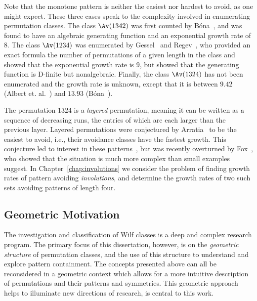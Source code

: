 \documentclass[12pt,twoside]{memoir}
\begin{document}
      Note that the monotone pattern is neither the easiest nor hardest to avoid,
      as one might expect.  These three cases speak to the complexity involved in
      enumerating permutation classes. The class $\Av(1342)$ was first counted by
      B\'ona~\cite{Bona1997}, and was found to have an algebraic generating
      function and an exponential growth rate  of $8$. The class $\Av(1234)$ was
      enumerated by Gessel~\cite{Gessel1990} and Regev~\cite{Regev}, who provided
      an exact formula the number of permutations of a given length in the class
      and showed that the exponential growth rate is $9$, but showed that the
      generating function is D-finite but nonalgebraic. Finally, the class
      $\Av(1324)$ has not been enumerated and the growth rate is unknown, except
      that it is between $9.42$ (Albert et.  al.~\cite{1324LowerBound}) and
      $13.93$ (B\'ona~\cite{1324UpperBound}). 

      The permutation $1324$ is a \emph{layered} permutation, meaning it can be
      written as a sequence of decreasing runs, the entries of which are each
      larger than the previous layer. Layered permutations were conjectured by
      Arratia~\cite{Arratia1999} to be the easiest to avoid, i.e., their
      avoidance classes have the fastest growth. This conjecture led to interest
      in these patterns~\cite{Claesson2012, Bona2007, Elder2005}, but was
      recently overturned by Fox~\cite{Fox}, who showed that the situation is
      much more complex than small examples suggest. 
      In Chapter~\ref{chap:involutions}
      we consider the problem of finding growth rates of pattern avoiding
      \emph{involutions}, and determine the growth rates of two such sets
      avoiding patterns of length four. 
      


   

    \subsection{Geometric Motivation}
      
      The investigation and classification of Wilf classes is a deep and complex
      research program.  The primary focus of this dissertation, however, is on
      the \emph{geometric structure} of permutation classes, and the use of this
      structure to understand and explore pattern containment. The concepts
      presented above can all be reconsidered in a geometric context which allows
      for a more intuitive description of permutations
      and their patterns and symmetries. This geometric approach helps to
      illuminate new directions of research, is central to this work. 
\end{document}
